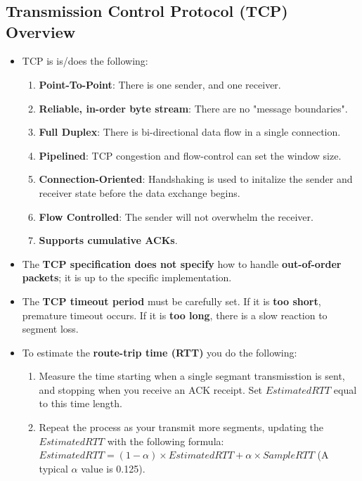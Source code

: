 \documentclass[16pt]{article}
\begin{document}
    \section*{}

    \subsection*{Transmission Control Protocol (TCP) Overview}
    \begin{itemize}
        \item TCP is is/does the following:
        \begin{enumerate}
            \item \textbf{Point-To-Point}: There is one sender, and one receiver.
            \item \textbf{Reliable, in-order byte stream}: There are no "message boundaries".
            \item \textbf{Full Duplex}: There is bi-directional data flow in a single connection.
            \item \textbf{Pipelined}: TCP congestion and flow-control can set the window size.
            \item \textbf{Connection-Oriented}: Handshaking is used to initalize the sender and receiver state before the data exchange begins.
            \item \textbf{Flow Controlled}: The sender will not overwhelm the receiver.
            \item \textbf{Supports cumulative ACKs}.
        \end{enumerate}
        \item The \textbf{TCP specification does not specify} how to handle \textbf{out-of-order packets}; it is up to the specific implementation. 
        \item The \textbf{TCP timeout period} must be carefully set. If it is \textbf{too short}, premature timeout occurs. If it is \textbf{too long}, there is a slow reaction to segment loss.
        \item To estimate the \textbf{route-trip time (RTT)} you do the following:
        \begin{enumerate}
            \item Measure the time starting when a single segmant transmisstion is sent, and stopping when you receive an ACK receipt. Set $EstimatedRTT$ equal to this time length.
            \item Repeat the process as your transmit more segments, updating the $EstimatedRTT$ with the following formula: $EstimatedRTT=(1-\alpha)\times{EstimatedRTT}+\alpha\times{SampleRTT}$ (A typical $\alpha$ value is 0.125).

\end{enumerate}
\end{itemize}
\end{document}
